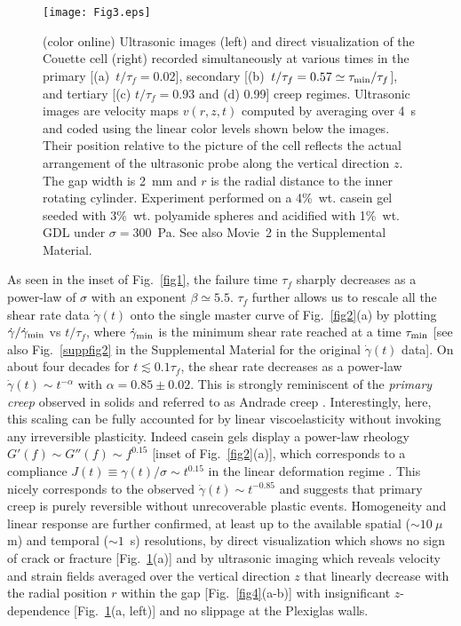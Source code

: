 \documentclass[twocolumn,superscriptaddress,showpacs,preprintnumbers,amsmath,amssymb,prl]{revtex4}
\newcommand\gp{\dot\gamma}
\newcommand\taum{\tau_{\rm min}}
\begin{document}
\begin{figure}[t]
\centering
\texttt{[image: Fig3.eps]}
\caption{(color online) Ultrasonic images (left) and direct visualization of the Couette cell (right) recorded simultaneously at various times in the primary [(a)~$t/\tau_f=0.02$], secondary [(b)~$t/\tau_f=0.57\simeq\taum/\tau_f$], and tertiary  [(c) $t/\tau_f=0.93$ and (d) 0.99] creep regimes. Ultrasonic images are velocity maps $v(r,z,t)$ computed by averaging over 4~s and coded using the linear color levels shown below the images. Their position relative to the picture of the cell reflects the actual arrangement of the ultrasonic probe along the vertical direction $z$. The gap width is 2~mm and $r$ is the radial distance to the inner rotating cylinder. Experiment performed on a 4\%~wt. casein gel seeded with 3\%~wt. polyamide spheres and acidified with 1\%~wt. GDL under $\sigma=300$~Pa. See also Movie~2 in the Supplemental Material.
\label{fig3}}
\end{figure} 

As seen in the inset of Fig.~\ref{fig1}, the failure time $\tau_f$ sharply decreases as a power-law of $\sigma$ with an exponent $\beta\simeq 5.5$. $\tau_f$ further allows us to rescale all the shear rate data $\gp(t)$ onto the single master curve of Fig.~\ref{fig2}(a) by plotting $\gp/\gp_{\rm min}$ vs $t/\tau_f$, where $\gp_{\rm min}$ is the minimum shear rate reached at a time $\tau_{\rm min}$ [see also Fig.~\ref{suppfig2} in the Supplemental Material for the original $\gp(t)$ data]. On about four decades for $t\lesssim 0.1\tau_f$, the shear rate decreases as a power-law $\gp(t)\sim t^{-\alpha}$ with $\alpha=0.85\pm 0.02$. This is strongly reminiscent of the {\it primary creep} observed in solids and referred to as Andrade creep \cite{Andrade:1910,Miguel:2002,Nechad:2005}. Interestingly, here, this scaling can be fully accounted for by linear viscoelasticity without invoking any irreversible plasticity. Indeed casein gels display a power-law rheology $G'(f)\sim G''(f)\sim f^{0.15}$ [inset of Fig.~\ref{fig2}(a)], which corresponds to a compliance $J(t)\equiv\gamma(t)/\sigma\sim t^{0.15}$ in the linear deformation regime \cite{Tschoegl:1989}. This nicely corresponds to the observed $\gp(t)\sim t^{-0.85}$ and suggests that primary creep is purely reversible without unrecoverable plastic events. Homogeneity and linear response are further confirmed, at least up to the available spatial ($\sim 10~\mu$m) and temporal ($\sim 1$~s) resolutions, by direct visualization which shows no sign of crack or fracture [Fig.~\ref{fig3}(a)] and by ultrasonic imaging which reveals velocity and strain fields averaged over the vertical direction $z$ that linearly decrease with the radial position $r$ within the gap [Fig.~\ref{fig4}(a-b)] with insignificant $z$-dependence [Fig.~\ref{fig3}(a, left)] and no slippage at the Plexiglas walls.
\end{document}
